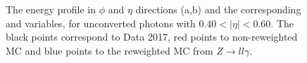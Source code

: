 \begin{figure}[ht]
    \caption{The energy profile in $\phi$ and $\eta$ directions (a,b) and the corresponding \Rphi and \Reta variables, for unconverted photons with 0.40$<|\eta|<$0.60. The black points correspond to Data 2017, red points to non-reweighted MC and blue points to the reweighted MC from $Z\rightarrow ll\gamma$.}
    \label{fig:gamma:ss:reweighting:photon:electron}
\end{figure}
